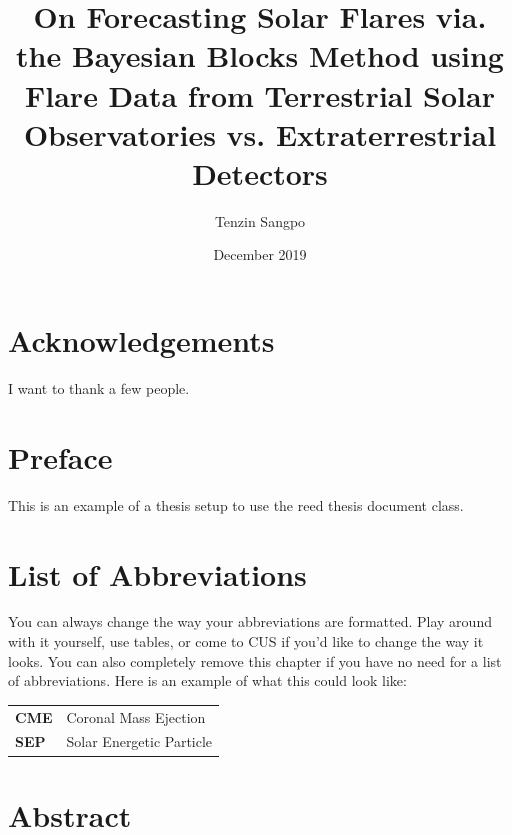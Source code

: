 \documentclass[12pt,twoside]{reedthesis}
\title{On Forecasting Solar Flares via. the Bayesian Blocks Method using Flare Data from Terrestrial Solar Observatories vs. Extraterrestrial Detectors}
\author{Tenzin Sangpo}
\date{December 2019}
\begin{document}
  \maketitle
  \frontmatter %
  \pagestyle{empty} %

    \chapter*{Acknowledgements}
	I want to thank a few people.

    \chapter*{Preface}
	This is an example of a thesis setup to use the reed thesis document class.
	
	

    \chapter*{List of Abbreviations}
		You can always change the way your abbreviations are formatted. Play around with it yourself, use tables, or come to CUS if you'd like to change the way it looks. You can also completely remove this chapter if you have no need for a list of abbreviations. Here is an example of what this could look like:

	\begin{table}[h]
	\centering %
	\begin{tabular}{ll}
		\textbf{CME}  	&  Coronal Mass Ejection \\
		\textbf{SEP}  	&  Solar Energetic Particle \\
	\end{tabular}
	\end{table}
	

    \tableofcontents
    \listoftables
    \listoffigures



    \chapter*{Abstract}
    
\end{document}
